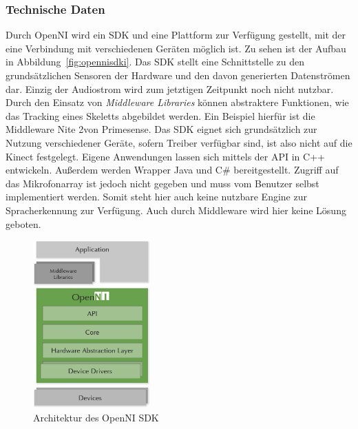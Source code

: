 
\subsubsection{Technische Daten}

Durch OpenNI wird ein SDK und eine Plattform zur Verf\"ugung gestellt, mit der eine Verbindung mit verschiedenen Ger\"aten m\"oglich ist. Zu sehen ist der Aufbau in Abbildung~\ref{fig:opennisdki}.
Das SDK stellt eine Schnittstelle zu den grunds\"atzlichen Sensoren der Hardware und den davon generierten Datenstr\"omen dar.
Einzig der Audiostrom wird zum jetztigen Zeitpunkt noch nicht nutzbar.
Durch den Einsatz von \textit{Middleware Libraries} k\"onnen abstraktere Funktionen, wie das Tracking eines Skeletts abgebildet werden. Ein Beispiel 
hierf\"ur ist die Middleware Nite 2\footnotemark[10] von Primesense. Das SDK eignet sich grunds\"atzlich zur Nutzung verschiedener Ger\"ate, 
sofern Treiber verf\"ugbar sind, ist also nicht auf die Kinect festgelegt.
Eigene Anwendungen lassen sich mittels der API in C++ entwickeln. Außerdem werden Wrapper Java und C\# bereitgestellt.
Zugriff auf das Mikrofonarray ist jedoch nicht gegeben und muss vom Benutzer selbst implementiert werden. 
Somit steht hier auch keine nutzbare Engine zur Spracherkennung zur Verf\"ugung.
Auch durch Middleware wird hier keine L\"osung geboten.

\begin{figure}[!]
\centering
\includegraphics[width=0.4\textwidth]{img/04kapitel/OpenNI2_Architecture2.png}
\caption[Kinect Explorer]{Architektur des OpenNI SDK\footnotemark[8]}
\label{fig:opennisdk}
\end{figure}

